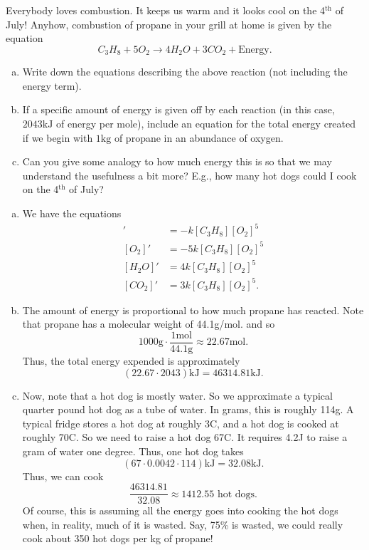 \documentclass[12pt]{article} %
\begin{document}
\begin{problem}
Everybody loves combustion. It keeps us warm and it looks cool on the 4$^\textrm{th}$ of July!  Anyhow, combustion of propane in your grill at home is given by the equation
    \[
        C_3 H_8 + 5O_2 \to 4H_2O + 3CO_2 + \textrm{Energy}.
    \]
    \begin{enumerate}[(a)]
        \item Write down the equations describing the above reaction (not including the energy term).
        \item If a specific amount of energy is given off by each reaction (in this case, $2043\textrm{kJ}$ of energy per mole), include an equation for the total energy created if we begin with $1\textrm{kg}$ of propane in an abundance of oxygen.
        \item Can you give some analogy to how much energy this is so that we may understand the usefulness a bit more? E.g., how many hot dogs could I cook on the 4$^\textrm{th}$ of July?
    \end{enumerate}
\end{problem}
\begin{solution}
    \begin{enumerate}[(a)]
        \item We have the equations
        \begin{align*}
            [C_3 H_8]' &= -k [C_3 H_8][O_2]^5 \\
            [O_2]' &= -5k [C_3 H_8][O_2]^5\\
            [H_2 O]' &= 4k [C_3 H_8][O_2]^5\\
            [CO_2]' &= 3k [C_3 H_8][O_2]^5.
        \end{align*}
        \item The amount of energy is proportional to how much propane has reacted.  Note that propane has a molecular weight of 44.1g/mol. and so 
        \[
            1000\textrm{g} \cdot \frac{1 \textrm{mol}}{44.1 \textrm{g}} \approx 22.67 \textrm{mol}.
        \]
        Thus, the total energy expended is approximately
        \[
            (22.67\cdot 2043) \textrm{kJ} =  46314.81 \textrm{kJ}.
        \]
        \item Now, note that a hot dog is mostly water. So we approximate a typical quarter pound hot dog as a tube of water.  In grams, this is roughly 114g. A typical fridge stores a hot dog at roughly 3C, and a hot dog is cooked at roughly 70C.  So we need to raise a hot dog 67C. It requires 4.2J to raise a gram of water one degree.  Thus, one hot dog takes
        \[
            (67\cdot 0.0042 \cdot 114) \textrm{kJ} = 32.08\textrm{kJ}.
        \]
        Thus, we can cook
        \[
            \frac{46314.81}{32.08} \approx 1412.55 \textrm{~hot dogs.}
         \]
        Of course, this is assuming all the energy goes into cooking the hot dogs when, in reality, much of it is wasted. Say, 75\% is wasted, we could really cook about 350 hot dogs per kg of propane!
    \end{enumerate}
\end{solution}
\end{document}
